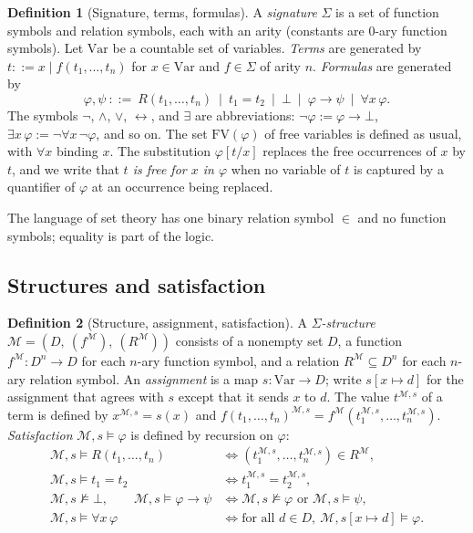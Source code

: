 \documentclass[11pt]{article}
\theoremstyle{definition}
\newtheorem{definition}{Definition}[section]
\theoremstyle{plain}
\theoremstyle{remark}
\begin{document}
\begin{definition}[Signature, terms, formulas]\label{def:sig}
A \emph{signature} $\Sigma$ is a set of function symbols and relation symbols, each with an arity (constants are $0$-ary function symbols). Let $\mathrm{Var}$ be a countable set of variables. \emph{Terms} are generated by $t::=x\mid f(t_1,\dots,t_n)$ for $x\in\mathrm{Var}$ and $f\in\Sigma$ of arity $n$. \emph{Formulas} are generated by
\[
\varphi,\psi\ ::=\ R(t_1,\dots,t_n)\ \mid\ t_1=t_2\ \mid\ \bot\ \mid\ \varphi\to\psi\ \mid\ \forall x\,\varphi .
\]
The symbols $\neg$, $\wedge$, $\vee$, $\leftrightarrow$, and $\exists$ are abbreviations: $\neg\varphi:=\varphi\to\bot$, $\exists x\,\varphi:=\neg\forall x\,\neg\varphi$, and so on. The set $\mathrm{FV}(\varphi)$ of free variables is defined as usual, with $\forall x$ binding $x$. The substitution $\varphi[t/x]$ replaces the free occurrences of $x$ by $t$, and we write that \emph{$t$ is free for $x$ in $\varphi$} when no variable of $t$ is captured by a quantifier of $\varphi$ at an occurrence being replaced.
\end{definition}

The language of set theory has one binary relation symbol $\in$ and no function symbols; equality is part of the logic.

\subsection{Structures and satisfaction}

\begin{definition}[Structure, assignment, satisfaction]\label{def:struct}
A \emph{$\Sigma$-structure} $\mathcal M=(D,\ (f^{\mathcal M}),\ (R^{\mathcal M}))$ consists of a nonempty set $D$, a function $f^{\mathcal M}:D^n\to D$ for each $n$-ary function symbol, and a relation $R^{\mathcal M}\subseteq D^n$ for each $n$-ary relation symbol. An \emph{assignment} is a map $s:\mathrm{Var}\to D$; write $s[x\mapsto d]$ for the assignment that agrees with $s$ except that it sends $x$ to $d$. The value $t^{\mathcal M,s}$ of a term is defined by $x^{\mathcal M,s}=s(x)$ and $f(t_1,\dots,t_n)^{\mathcal M,s}=f^{\mathcal M}(t_1^{\mathcal M,s},\dots,t_n^{\mathcal M,s})$. \emph{Satisfaction} $\mathcal M,s\models\varphi$ is defined by recursion on $\varphi$:
\begin{align*}
\mathcal M,s\models R(t_1,\dots,t_n)&\iff(t_1^{\mathcal M,s},\dots,t_n^{\mathcal M,s})\in R^{\mathcal M},\\
\mathcal M,s\models t_1=t_2&\iff t_1^{\mathcal M,s}=t_2^{\mathcal M,s},\\
\mathcal M,s\not\models\bot,\qquad
\mathcal M,s\models\varphi\to\psi&\iff \mathcal M,s\not\models\varphi\text{ or }\mathcal M,s\models\psi,\\
\mathcal M,s\models\forall x\,\varphi&\iff\text{for all }d\in D,\ \mathcal M,s[x\mapsto d]\models\varphi .
\end{align*}
\end{definition}
\end{document}
